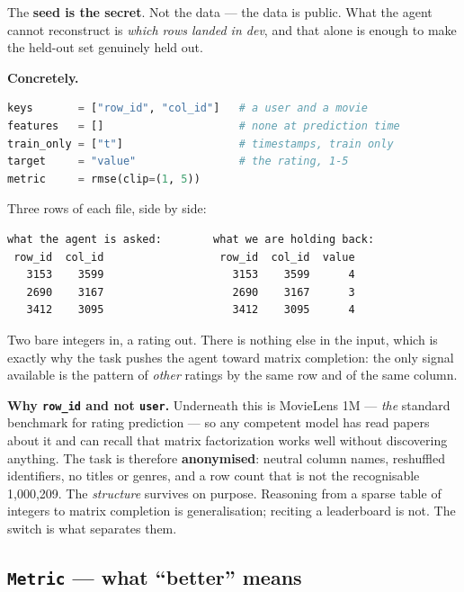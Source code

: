 \documentclass[11pt]{article}
\newcommand{\runin}[1]{\smallskip\noindent\textbf{#1}\quad}
\begin{document}
The \textbf{seed is the secret}. Not the data --- the data is public. What the agent cannot
reconstruct is \emph{which rows landed in dev}, and that alone is enough to make the held-out set
genuinely held out.

\runin{Concretely.}

\begin{lstlisting}[language=Python]
keys       = ["row_id", "col_id"]   # a user and a movie
features   = []                     # none at prediction time
train_only = ["t"]                  # timestamps, train only
target     = "value"                # the rating, 1-5
metric     = rmse(clip=(1, 5))
\end{lstlisting}

\noindent Three rows of each file, side by side:

\begin{lstlisting}
what the agent is asked:        what we are holding back:
 row_id  col_id                  row_id  col_id  value
   3153    3599                    3153    3599      4
   2690    3167                    2690    3167      3
   3412    3095                    3412    3095      4
\end{lstlisting}

\noindent Two bare integers in, a rating out. There is nothing else in the input, which is
exactly why the task pushes the agent toward matrix completion: the only signal available is the
pattern of \emph{other} ratings by the same row and of the same column.

\begin{aside}
\textbf{Why \texttt{row\_id} and not \texttt{user}.} Underneath this is MovieLens 1M ---
\emph{the} standard benchmark for rating prediction --- so any competent model has read papers
about it and can recall that matrix factorization works well without discovering anything. The
task is therefore \textbf{anonymised}: neutral column names, reshuffled identifiers, no titles or
genres, and a row count that is not the recognisable 1{,}000{,}209. The \emph{structure} survives
on purpose. Reasoning from a sparse table of integers to matrix completion is generalisation;
reciting a leaderboard is not. The switch is what separates them.
\end{aside}

\subsection{\texttt{Metric} --- what ``better'' means}
\end{document}
